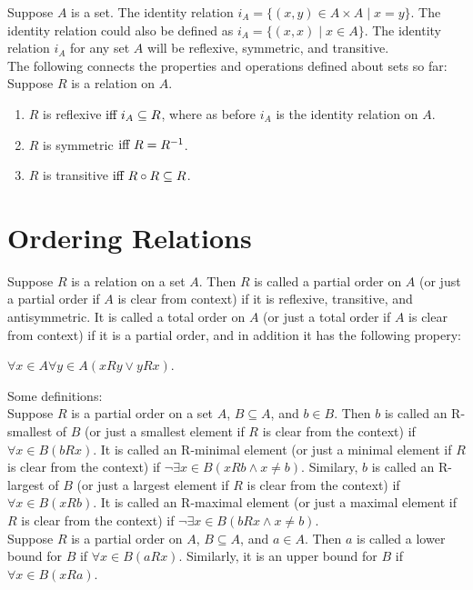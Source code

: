 \documentclass{article}
\begin{document}
\noindent Suppose $A$ is a set. The \gls{identity relation} $i_{A} = \{(x,y) \in A \times A \mid x = y \}$. The identity relation could also be defined as $i_{A} = \{(x,x) \mid x \in A \}$. The identity relation $i_{A}$ for any set $A$ will be reflexive, symmetric, and transitive.\\

\noindent The following connects the properties and operations defined about sets so far:\\
Suppose $R$ is a relation on $A$.
\begin{enumerate}
    \item $R$ is reflexive$\text{ iff } i_{A} \subseteq R$, where as before $i_{A}$ is the identity relation on $A$.
    \item $R$ is symmetric$\text{ iff } R = R^{-1}$.
    \item $R$ is transitive$\text{ iff } R \circ R \subseteq R$.
\end{enumerate}

\section{Ordering Relations}
Suppose $R$ is a relation on a set $A$. Then $R$ is called a \gls{partial order} on $A$ (or just a partial order if $A$ is clear from context) if it is reflexive, transitive, and antisymmetric. It is called a \gls{total order} on $A$ (or just a total order if $A$ is clear from context) if it is a partial order, and in addition it has the following propery:
\begin{center}
    $\forall x \in A \forall y \in A(xRy \lor yRx)$.
\end{center}
Some definitions:\\
Suppose $R$ is a partial order on a set $A$, $B \subseteq A$, and $b \in B$. Then $b$ is called an R-\gls{smallest} of $B$ (or just a smallest element if $R$ is clear from the context) if $\forall x \in B(bRx)$. It is called an R-\gls{minimal} element (or just a minimal element if $R$ is clear from the context) if $\lnot \exists x \in B(xRb \land x \neq b)$. Similary, $b$ is called an R-\gls{largest} of $B$ (or just a largest element if $R$ is clear from the context) if $\forall x \in B(xRb)$. It is called an R-\gls{maximal} element (or just a maximal element if $R$ is clear from the context) if $\lnot \exists x \in B(bRx \land x \neq b)$.\\

\noindent Suppose $R$ is a partial order on $A$, $B \subseteq A$, and $a \in A$. Then $a$ is called a \gls{lower bound} for $B$ if $\forall x \in B(aRx)$. Similarly, it is an \gls{upper bound} for $B$ if $\forall x \in B(xRa)$.\\
\end{document}
